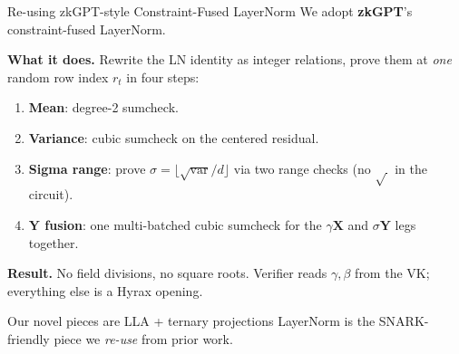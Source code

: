 \documentclass[10pt]{beamer}
\newcommand{\bX}{\mathbf{X}}
\newcommand{\bY}{\mathbf{Y}}
\begin{document}
\begin{frame}{Re-using zkGPT-style Constraint-Fused LayerNorm}
We adopt \textbf{zkGPT}'s constraint-fused LayerNorm.

\medskip
\textbf{What it does.} Rewrite the LN identity as integer relations,
prove them at \emph{one} random row index $r_t$ in four steps:
\begin{enumerate}
  \item \textbf{Mean}: degree-2 sumcheck.
  \item \textbf{Variance}: cubic sumcheck on the centered residual.
  \item \textbf{Sigma range}: prove
        $\sigma=\lfloor\sqrt{\mathrm{var}}/d\rfloor$ via two
        range checks (no $\sqrt{\,}$ in the circuit).
  \item \textbf{$\bY$ fusion}: one multi-batched cubic sumcheck for
        the $\gamma\bX$ and $\sigma\bY$ legs together.
\end{enumerate}

\medskip
\textbf{Result.} No field divisions, no square roots. Verifier reads
$\gamma,\beta$ from the VK; everything else is a Hyrax opening.

\medskip
\begin{block}{Our novel pieces are LLA + ternary projections}
LayerNorm is the SNARK-friendly piece we \emph{re-use} from prior work.
\end{block}
\end{frame}
\end{document}
